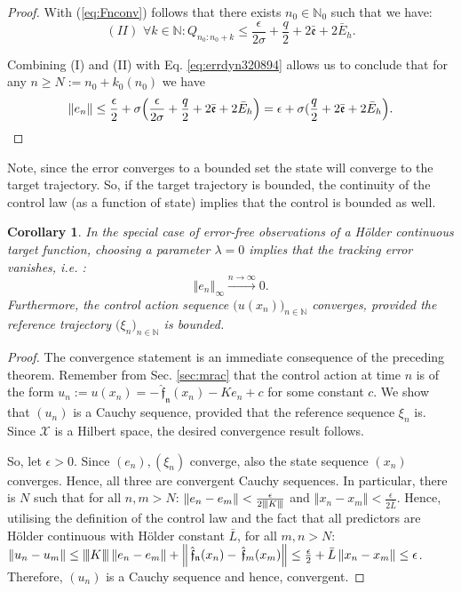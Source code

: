 \documentclass{article} %
\newtheorem{cor}[thm]{Corollary}
\theoremstyle{definition}
\theoremstyle{remark}
\newcommand{\matnorm}[1]{{\left\vert\kern-0.25ex\left\vert\kern-0.25ex\left\vert #1 
    \right\vert\kern-0.25ex\right\vert\kern-0.25ex\right\vert}}
\newcommand{\norm}[1]{\left\Vert#1\right\Vert}
\newcommand{\nat}{\mathbb N}
\newcommand{\vc}[1]{#1}
\newcommand{\inspace}{\ensuremath{ \mathcal X}}
\newcommand{\predf}{\, \mathfrak{  \hat f}} %
\newcommand{\predfn}{\, \mathfrak{  \hat f_n}} %
\newcommand{\hestthresh}{\ensuremath{ \lambda}}
\newcommand{\obserrbnd}{\bar{\mathfrak e}}
\newcommand{\seq}[2]{\ensuremath{\bigl(#1\bigr)_{#2}}}
\begin{document}
\begin{proof}
With (\ref{eq:Fnconv}) follows that there exists $n_0 \in \nat_0$ such that we have: $$ (II) \,\,  \forall k \in \nat : Q_{n_0:n_0+k}\leq  \frac{\epsilon}{2 \sigma} +\frac q 2 + 2  \obserrbnd  +2 \bar E_h.
 $$


%

Combining (I) and (II) with Eq. \ref{eq:errdyn320894} allows us to conclude that for any $n \geq N:= n_0 +k_0(n_0)$  we have 
\begin{equation*}
\norm{\vc e_{n}} \leq \frac \epsilon 2 + \sigma \Bigl (\frac{\epsilon}{2  \sigma} +\frac q 2 + 2  \obserrbnd  +2 \bar E_h\Bigr) =\epsilon +\sigma (\frac q 2 + 2  \obserrbnd  +2 \bar E_h \Bigr). 
\label{eq:errdyn3208942}
\end{equation*}
\end{proof}
Note, since the error converges to a bounded set the state will converge to the target trajectory. So, if the target trajectory is bounded, the continuity of the control law (as a function of state) implies that the control is bounded as well.

%
%
\begin{cor}
In the special case of error-free observations of a H\"older continuous target function, choosing a parameter $\hestthresh =0$ implies that the tracking error vanishes, i.e. :
\[\norm{e_n}_\infty \stackrel{n \to \infty}{\longrightarrow} 0. \]
Furthermore, the control action sequence $\seq{u(x_n)}{n \in \nat}$ converges, provided the reference trajectory $\seq{\xi_n}{n \in \nat}$ is bounded.
\end{cor}

\begin{proof} The convergence statement is an immediate consequence of the preceding theorem. 
Remember from Sec. \ref{sec:mrac} that the control action at time $n$ is of the form $u_n := u(x_n) = -\predfn(x_n) - K e_n +c $ for some constant $c$. We show that $(u_n)$ is a Cauchy sequence, provided that the reference sequence $\xi_n$ is. Since $\inspace$ is a Hilbert space, the desired convergence result follows.

So, let $\epsilon >0$. Since $(e_n),(\xi_n)$ converge, also the state sequence $(x_n)$ converges. Hence, all three are convergent Cauchy sequences. In particular, there is $N$ such that for all $n,m >N$: $\norm{e_n-e_m}< \frac{\epsilon} {2 \matnorm{K}}$ and $\norm{x_n-x_m}< \frac{\epsilon} {2\bar L}$. 
Hence, utilising the definition of the control law and the fact that all predictors are H\"older continuous with H\"older constant $\bar L$, for all $m,n >N:$ $\norm{u_n-u_m} \leq \matnorm{K} \norm{e_n -e_m} + \norm{\predfn(x_n) - \predf_m(x_m) } \leq \frac{\epsilon}{2} + \bar L \norm{x_n -x_m} \leq \epsilon $. Therefore, $(u_n)$ is a Cauchy sequence and hence, convergent.

\end{proof}
\end{document}

